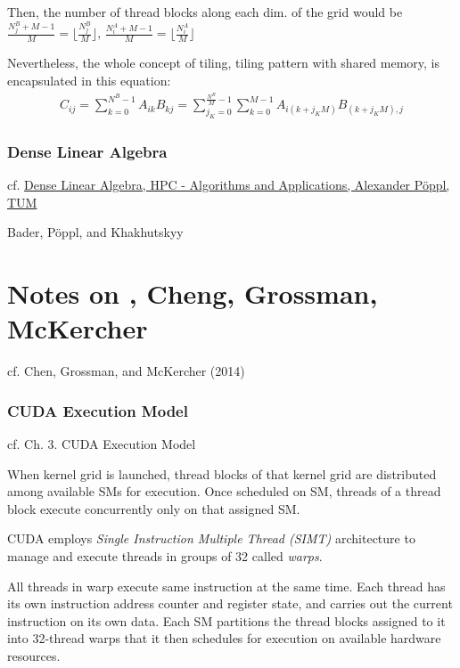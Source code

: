 \documentclass[10pt]{amsart}
\begin{document}
\begin{multicols*}{2}
Then, the number of thread blocks along each dim. of the grid would be $\frac{N_j^B+M-1}{M} = \lfloor \frac{N_j^B}{M} \rfloor , \, \frac{N_i^A + M-1}{M} = \lfloor \frac{N_i^A}{M} \rfloor $  

Nevertheless, the whole concept of tiling, tiling pattern with shared memory, is encapsulated in this equation:
\begin{equation}
\begin{gathered}
	C_{ij} = \sum_{k=0}^{N^B-1} A_{ik} B_{kj} = \sum_{j_K=0}^{\frac{N^B}{M}-1} \sum_{k=0}^{M-1} A_{i(k+j_KM)}B_{(k+j_KM), j}
\end{gathered}
\end{equation}



\section{Dense Linear Algebra}

cf. \href{https://www5.in.tum.de/lehre/vorlesungen/hpc/WS16/tutorial/sparse_02.pdf}{Dense Linear Algebra, HPC - Algorithms and Applications, Alexander P\"oppl, TUM}


Bader, P\"{o}ppl, and Khakhutskyy \cite{BaPK2016}



\part{Notes on , Cheng, Grossman, McKercher}

cf. Chen, Grossman, and McKercher (2014) \cite{CGM2014}



\section{CUDA Execution Model}
cf. Ch. 3.  CUDA Execution Model 

When kernel grid is launched, thread blocks of that kernel grid are distributed among available SMs for execution.  Once scheduled on SM, threads of a thread block execute concurrently only on that assigned SM.  

CUDA employs \emph{Single Instruction Multiple Thread (SIMT)} architecture to manage and execute threads in groups of 32 called \emph{warps}.  

All threads in warp execute same instruction at the same time.  Each thread has its own instruction address counter and register state, and carries out the current instruction on its own data.  Each SM partitions the thread blocks assigned to it into 32-thread warps that it then schedules for execution on available hardware resources.  


\end{multicols*}
\end{document}

